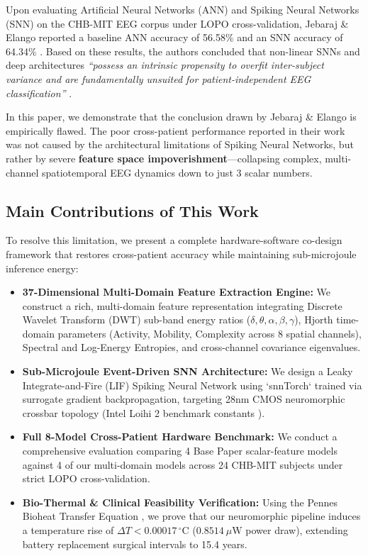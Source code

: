\documentclass[pdflatex,sn-mathphys-num]{sn-jnl}%
\begin{document}
Upon evaluating Artificial Neural Networks (ANN) and Spiking Neural Networks (SNN) on the CHB-MIT EEG corpus under LOPO cross-validation, Jebaraj \& Elango reported a baseline ANN accuracy of 56.58\% and an SNN accuracy of 64.34\% \cite{jebaraj2026}. Based on these results, the authors concluded that non-linear SNNs and deep architectures \emph{``possess an intrinsic propensity to overfit inter-subject variance and are fundamentally unsuited for patient-independent EEG classification''} \cite{jebaraj2026}.

In this paper, we demonstrate that the conclusion drawn by Jebaraj \& Elango is empirically flawed. The poor cross-patient performance reported in their work was not caused by the architectural limitations of Spiking Neural Networks, but rather by severe \textbf{feature space impoverishment}---collapsing complex, multi-channel spatiotemporal EEG dynamics down to just 3 scalar numbers.

\subsection{Main Contributions of This Work}

To resolve this limitation, we present a complete hardware-software co-design framework that restores cross-patient accuracy while maintaining sub-microjoule inference energy:

\begin{itemize}
    \item \textbf{37-Dimensional Multi-Domain Feature Extraction Engine:} We construct a rich, multi-domain feature representation integrating Discrete Wavelet Transform (DWT) sub-band energy ratios ($\delta, \theta, \alpha, \beta, \gamma$), Hjorth time-domain parameters (Activity, Mobility, Complexity across 8 spatial channels), Spectral and Log-Energy Entropies, and cross-channel covariance eigenvalues.
    \item \textbf{Sub-Microjoule Event-Driven SNN Architecture:} We design a Leaky Integrate-and-Fire (LIF) Spiking Neural Network using `snnTorch` \cite{eshraghian2023training} trained via surrogate gradient backpropagation, targeting 28nm CMOS neuromorphic crossbar topology (Intel Loihi 2 benchmark constants \cite{davies2018loihi}).
    \item \textbf{Full 8-Model Cross-Patient Hardware Benchmark:} We conduct a comprehensive evaluation comparing 4 Base Paper scalar-feature models against 4 of our multi-domain models across 24 CHB-MIT subjects under strict LOPO cross-validation.
    \item \textbf{Bio-Thermal & Clinical Feasibility Verification:} Using the Pennes Bioheat Transfer Equation \cite{pennes1948analysis}, we prove that our neuromorphic pipeline induces a temperature rise of $\Delta T < 0.00017\,^\circ\text{C}$ ($0.8514\ \mu\text{W}$ power draw), extending battery replacement surgical intervals to 15.4 years.
\end{itemize}
\end{document}
